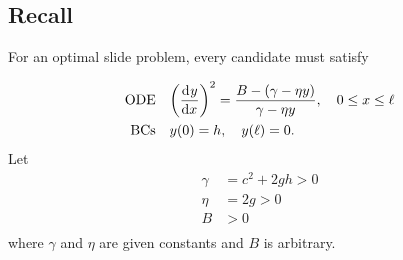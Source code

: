 \documentclass[12pt,twoside]{article}
\begin{document}
\subsection{Recall}
For an optimal slide problem, every candidate must satisfy

\begin{align*}
  \text{ODE} &\quad {\left(\ensuremath{\frac{\mathrm{d}^{} {y}}{\mathrm{d}{x}^{}}}\right)}^2= \frac{B-(\gamma-\eta y)}{\gamma-\eta y},\quad 0\le x\le\ell \\
  \text{BCs} &\quad y(0)=h,\quad y(\ell)=0.
\end{align*}
Let
\begin{align*}
  \gamma &= c^2+2gh>0 \\
  \eta &= 2g>0 \\
  B &>0 \\
\end{align*}
where $\gamma$ and $\eta$ are given constants and $B$ is arbitrary.
\end{document}

